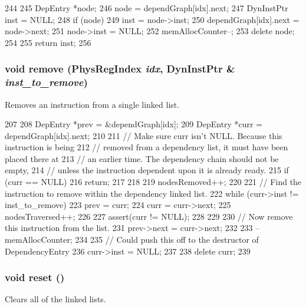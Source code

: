 \begin{DoxyCode}
244 {
245     DepEntry *node;
246     node = dependGraph[idx].next;
247     DynInstPtr inst = NULL;
248     if (node) {
249         inst = node->inst;
250         dependGraph[idx].next = node->next;
251         node->inst = NULL;
252         memAllocCounter--;
253         delete node;
254     }
255     return inst;
256 }
\end{DoxyCode}
\hypertarget{classDependencyGraph_a0f84aaa20d93732630c72593b97f5e13}{
\subsubsection[{remove}]{\setlength{\rightskip}{0pt plus 5cm}void remove ({\bf PhysRegIndex} {\em idx}, \/  DynInstPtr \& {\em inst\_\-to\_\-remove})}}
\label{classDependencyGraph_a0f84aaa20d93732630c72593b97f5e13}
Removes an instruction from a single linked list. 


\begin{DoxyCode}
207 {
208     DepEntry *prev = &dependGraph[idx];
209     DepEntry *curr = dependGraph[idx].next;
210 
211     // Make sure curr isn't NULL.  Because this instruction is being
212     // removed from a dependency list, it must have been placed there at
213     // an earlier time.  The dependency chain should not be empty,
214     // unless the instruction dependent upon it is already ready.
215     if (curr == NULL) {
216         return;
217     }
218 
219     nodesRemoved++;
220 
221     // Find the instruction to remove within the dependency linked list.
222     while (curr->inst != inst_to_remove) {
223         prev = curr;
224         curr = curr->next;
225         nodesTraversed++;
226 
227         assert(curr != NULL);
228     }
229 
230     // Now remove this instruction from the list.
231     prev->next = curr->next;
232 
233     --memAllocCounter;
234 
235     // Could push this off to the destructor of DependencyEntry
236     curr->inst = NULL;
237 
238     delete curr;
239 }
\end{DoxyCode}
\hypertarget{classDependencyGraph_ad20897c5c8bd47f5d4005989bead0e55}{
\subsubsection[{reset}]{\setlength{\rightskip}{0pt plus 5cm}void reset ()}}
\label{classDependencyGraph_ad20897c5c8bd47f5d4005989bead0e55}
Clears all of the linked lists. 



